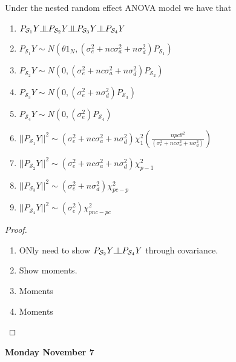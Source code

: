 \documentclass[11pt,fleqn]{book} %
\newcommand{\indep}{\rotatebox[origin=c]{90}{$\models$}}
\begin{document}
\begin{theorem}
	Under the nested random effect ANOVA model we have that

		\begin{enumerate}
			\item $P_{\mathcal{S}_1}Y \indep P_{\mathcal{S}_2}Y \indep P_{\mathcal{S}_3}Y \indep P_{\mathcal{S}_4}Y $

			\item $P_{\mathcal{S}_1}Y \sim N(\theta 1_N, (\sigma_e^2 + nc \sigma^2_a + n\sigma_d^2)P_{\mathcal{S}_1})$

			\item $P_{\mathcal{S}_2}Y \sim N(0, (\sigma_e^2 + nc \sigma^2_a + n\sigma_d^2)P_{\mathcal{S}_2})$

			\item $P_{\mathcal{S}_3}Y \sim N(0, (\sigma_e^2 + n\sigma_d^2)P_{\mathcal{S}_3})$

			\item $P_{\mathcal{S}_4}Y \sim N(0, (\sigma_e^2)P_{\mathcal{S}_4})$
			
			\item $||P_{\mathcal{S}_1}Y||^2  \sim (\sigma_e^2 + nc \sigma^2_a + n\sigma_d^2)\chi^2_{1}(\frac{n pc \theta^2}{(\sigma_e^2 + nc \sigma^2_a + n\sigma_d^2)})$

			\item $||P_{\mathcal{S}_2}Y||^2  \sim (\sigma_e^2 + nc \sigma^2_a + n\sigma_d^2)\chi^2_{p - 1}$

			\item $||P_{\mathcal{S}_3}Y||^2  \sim (\sigma_e^2  + n\sigma_d^2)\chi^2_{pc - p}$

			\item $||P_{\mathcal{S}_4}Y||^2  \sim (\sigma_e^2)\chi^2_{pnc - pc}$
		\end{enumerate}
\end{theorem}

\begin{proof}
\begin{enumerate}
		\item ONly need to show $P_{\mathcal{S}_2} Y \indep P_{\mathcal{S}_4} Y $ through covariance. 	
		\item Show moments. 
		\item Moments
		\item Moments 
	\end{enumerate}	
\end{proof}


\textbf{Monday November 7}\\
\end{document}
